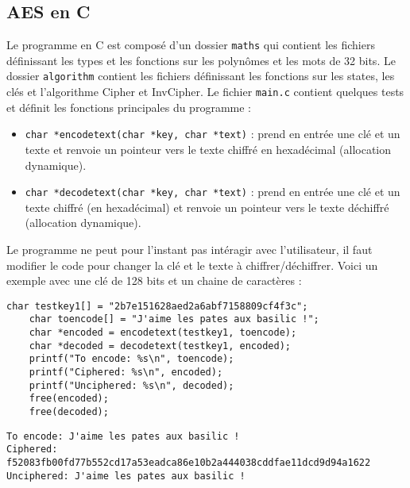 \documentclass[12pt]{article}
\begin{document}
\subsection{AES en C}
Le programme en C est composé d'un dossier \texttt{maths} qui contient les fichiers définissant les types et les fonctions sur les polynômes et les mots de 32 bits. Le dossier \texttt{algorithm} contient les fichiers définissant les fonctions sur les states, les clés et l'algorithme Cipher et InvCipher. Le fichier \texttt{main.c} contient quelques tests et définit les fonctions principales du programme :
\begin{itemize}
    \item \texttt{char *encodetext(char *key, char *text)} : prend en entrée une clé et un texte et renvoie un pointeur vers le texte chiffré en hexadécimal (allocation dynamique).
    \item \texttt{char *decodetext(char *key, char *text)} : prend en entrée une clé et un texte chiffré (en hexadécimal) et renvoie un pointeur vers le texte déchiffré (allocation dynamique).
\end{itemize}
Le programme ne peut pour l'instant pas intéragir avec l'utilisateur, il faut modifier le code pour changer la clé et le texte à chiffrer/déchiffrer. Voici un exemple avec une clé de 128 bits et un chaine de caractères :
\begin{lstlisting}[caption=Contenu de la fonction \texttt{main},style=CStyle]
    char testkey1[] = "2b7e151628aed2a6abf7158809cf4f3c";
    char toencode[] = "J'aime les pates aux basilic !";
    char *encoded = encodetext(testkey1, toencode);
    char *decoded = decodetext(testkey1, encoded);
    printf("To encode: %s\n", toencode);
    printf("Ciphered: %s\n", encoded);
    printf("Unciphered: %s\n", decoded);
    free(encoded);
    free(decoded);
\end{lstlisting}
\begin{lstlisting}[caption=Résultat de l'exécution du programme \texttt{aes.out},style=CStyleL]
To encode: J'aime les pates aux basilic !
Ciphered: f52083fb00fd77b552cd17a53eadca86e10b2a444038cddfae11dcd9d94a1622
Unciphered: J'aime les pates aux basilic !
\end{lstlisting}
\end{document}
